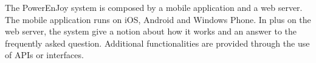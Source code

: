 The PowerEnJoy system is composed by a mobile application and a web server. The mobile application runs on iOS, Android and Windows Phone. In plus on the web server, the system give a notion about how it works and an answer to the frequently asked question. Additional functionalities are provided through the use of APIs or interfaces.